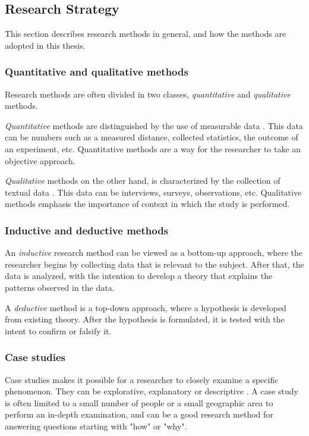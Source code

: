 \documentclass[12pt, a4paper, onecolumn]{article}
\begin{document}
	\subsection{Research Strategy}
	
	This section describes research methods in general, and how the methods are adopted in this thesis.
	
	\subsubsection{Quantitative and qualitative methods}
	
	Research methods are often divided in two classes, \textit{quantitative} and \textit{qualitative} methods.
	
	\textit{Quantitative} methods are distinguished by the use of measurable data \cite[p~54]{borrego}. This data can be numbers such as a measured distance, collected statistics, the outcome of an experiment, etc. Quantitative methods are a way for the researcher to take an objective approach.
	
	\textit{Qualitative} methods on the other hand, is characterized by the collection of textual data \cite[p~55]{borrego}. This data can be interviews, surveys, observations, etc. Qualitative methods emphasis the importance of context in which the study is performed.
	
	\subsubsection{Inductive and deductive methods}
	
	An \textit{inductive} research method can be viewed as a bottom-up approach, where the researcher begins by collecting data that is relevant to the subject. After that, the data is analyzed, with the intention to develop a theory that explains the patterns observed in the data.
	
	A \textit{deductive} method is a top-down approach, where a hypothesis is developed from existing theory. After the hypothesis is formulated, it is tested with the intent to confirm or falsify it.
	
	\subsubsection{Case studies}
	
	Case studies makes it possible for a researcher to closely examine a specific phenomenon. They can be explorative, explanatory or descriptive \cite[p~4]{yin}. A case study is often limited to a small number of people or a small geographic area to perform an in-depth examination, and can be a good research method for answering questions starting with "how" or "why".
	
\end{document}
